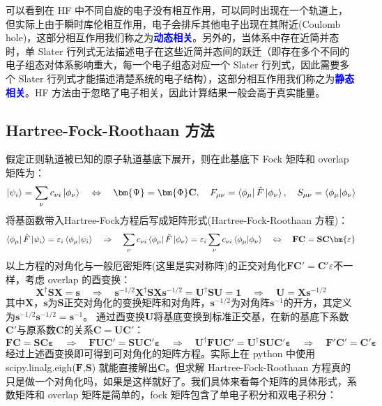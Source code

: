 可以看到在 HF 中不同自旋的电子没有相互作用，可以同时出现在一个轨道上，但实际上由于瞬时库伦相互作用，电子会排斥其他电子出现在其附近(Coulomb hole)，这部分相互作用我们称之为\textcolor{blue}{\textbf{动态相关}}。另外的，当体系中存在近简并态时，单 Slater 行列式无法描述电子在这些近简并态间的跃迁（即存在多个不同的电子组态对体系影响重大，每一个电子组态对应一个 Slater 行列式，因此需要多个 Slater 行列式才能描述清楚系统的电子结构），这部分相互作用我们称之为\textcolor{blue}{\textbf{静态相关}}。HF 方法由于忽略了电子相关，因此计算结果一般会高于真实能量。

\subsection{Hartree-Fock-Roothaan 方法}
假定正则轨道被已知的原子轨道基底下展开，则在此基底下 Fock 矩阵和 overlap 矩阵为：
\[\ket{\psi_i}=\sum_{\nu}c_{\nu i}\ket{\phi_{\nu}} \quad \Leftrightarrow \quad \bm{\Psi}=\bm{\Phi}\mathbf{C}, \quad F_{\mu\nu}=\bra{\phi_{\mu}}\hat{F}\ket{\phi_{\nu}}, \quad S_{\mu\nu}=\bra{\phi_{{\mu}}}\ket{\phi_{\nu}}\]
将基函数带入Hartree-Fock方程后写成矩阵形式(Hartree-Fock-Roothaan 方程)：
\[\bra{\phi_{\mu}}\hat{F}\ket{\psi_i}=\varepsilon_i\bra{\phi_{\mu}}\ket{\psi_i} \quad \Rightarrow \quad \sum_{\nu}c_{\nu i}\bra{\phi_{\mu}}\hat{F}\ket{\phi_{\nu}}=\varepsilon_i\sum_{\nu}c_{\nu i}\bra{\phi_{\mu}}\ket{\phi_{\nu}} \quad \Leftrightarrow \quad \mathbf{F}\mathbf{C}=\mathbf{S}\mathbf{C}\bm{\varepsilon}\]
以上方程的对角化与一般厄密矩阵(这里是实对称阵)的正交对角化$\mathbf{F}\mathbf{C}'=\mathbf{C}'\varepsilon$不一样，考虑 overlap 的酉变换：
\[\mathbf{X}^{\dagger}\mathbf{S}\mathbf{X}=\mathbf{s} \quad \Rightarrow \quad \mathbf{s}^{-1/2}\mathbf{X}^{\dagger}\mathbf{S}\mathbf{X}\mathbf{s}^{-1/2}=\mathbf{U}^{\dagger}\mathbf{S}\mathbf{U}=\mathbf{1} \quad \Rightarrow \quad \mathbf{U}=\mathbf{X}\mathbf{s}^{-1/2}\]
其中$\mathbf{X}$，$\mathbf{s}$为$\mathbf{S}$正交对角化的变换矩阵和对角阵，$\mathbf{s}^{-1/2}$为对角阵$\mathbf{s}^{-1}$的开方，其定义为$\mathbf{s}^{-1/2}\mathbf{s}^{-1/2}=\mathbf{s}^{-1}$。
通过酉变换$\mathbf{U}$将基底变换到标准正交基，在新的基底下系数$\mathbf{C}'$与原系数$\mathbf{C}$的关系$\mathbf{C}=\mathbf{U}\mathbf{C}'$：
\[\mathbf{F}\mathbf{C}=\mathbf{S}\mathbf{C}\bm{\varepsilon} \quad \Rightarrow \quad \mathbf{F}\mathbf{U}\mathbf{C}'=\mathbf{S}\mathbf{U}\mathbf{C}'\bm{\varepsilon} \quad \Rightarrow \quad \mathbf{U}^{\dagger}\mathbf{F}\mathbf{U}\mathbf{C}'=\mathbf{U}^{\dagger}\mathbf{S}\mathbf{U}\mathbf{C}'\bm{\varepsilon}\quad \Rightarrow \quad \mathbf{F}'\mathbf{C}'=\mathbf{C}'\bm{\varepsilon}\]
经过上述酉变换即可得到可对角化的矩阵方程。实际上在 python 中使用 scipy.linalg.eigh($\mathbf{F}$,$\mathbf{S}$) 就能直接解出$\mathbf{C}$。但求解 Hartree-Fock-Roothaan 方程真的只是做一个对角化吗，如果是这样就好了。我们具体来看每个矩阵的具体形式，系数矩阵和 overlap 矩阵是简单的，fock 矩阵包含了单电子积分和双电子积分：
